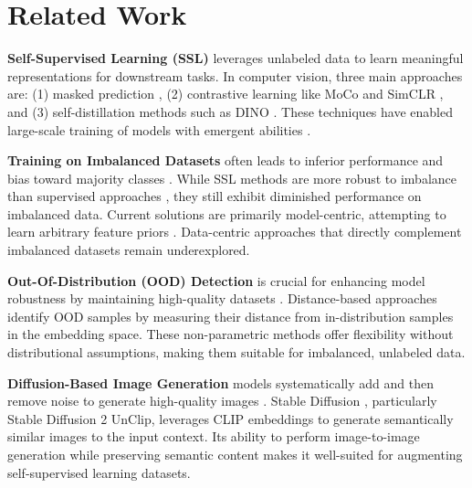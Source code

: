 \section{Related Work}
\label{sec:related-work}

\noindent
\textbf{Self-Supervised Learning (SSL)} leverages unlabeled data to learn meaningful representations for downstream tasks. In computer vision, three main approaches are: (1) masked prediction \cite{he2022masked}, (2) contrastive learning like MoCo \cite{he2020momentum} and SimCLR \cite{chen2020simple}, and (3) self-distillation methods such as DINO \cite{DINO}. These techniques have enabled large-scale training of models with emergent abilities \cite{wei2022emergent}.

\noindent
\textbf{Training on Imbalanced Datasets} often leads to inferior performance and bias toward majority classes \cite{johnson2019survey}. While SSL methods are more robust to imbalance than supervised approaches \cite{liu2021self}, they still exhibit diminished performance on imbalanced data. Current solutions are primarily model-centric, attempting to learn arbitrary feature priors \cite{assran2210hidden}. Data-centric approaches that directly complement imbalanced datasets remain underexplored.

\noindent
\textbf{Out-Of-Distribution (OOD) Detection} is crucial for enhancing model robustness by maintaining high-quality datasets \cite{whang2023data}. Distance-based approaches \cite{sun2022out} identify OOD samples by measuring their distance from in-distribution samples in the embedding space. These non-parametric methods offer flexibility without distributional assumptions, making them suitable for imbalanced, unlabeled data.

\noindent
\textbf{Diffusion-Based Image Generation} models systematically add and then remove noise to generate high-quality images \cite{ho2020denoising}. Stable Diffusion \cite{rombach2022highresolution}, particularly Stable Diffusion 2 UnClip, leverages CLIP embeddings to generate semantically similar images to the input context. Its ability to perform image-to-image generation while preserving semantic content makes it well-suited for augmenting self-supervised learning datasets.